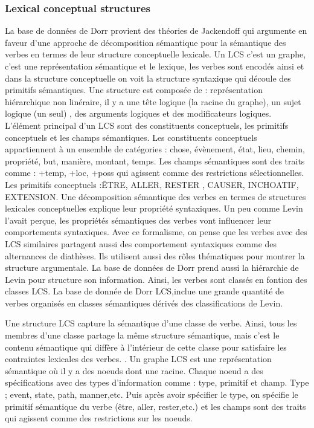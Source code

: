\subsubsection{Lexical conceptual structures}
La base de données de Dorr provient des théories de Jackendoff qui argumente en faveur d'une approche de décomposition sémantique pour la sémantique des verbes en termes de leur structure conceptuelle lexicale\citep{DorrUseLexicalSemantics1992}. Un LCS c'est un graphe, c'est une représentation sémantique et le lexique, les verbes sont encodés ainsi et dans la structure conceptuelle on voit la structure syntaxique qui découle des primitifs sémantiques. Une structure est composée de : représentation hiérarchique non linéraire, il y a une tête logique (la racine du graphe), un sujet logique (un seul) , des arguments logiques et des modificateurs logiques. L'élément principal d'un LCS sont des constituents conceptuels, les primitifs conceptuels et les champs sémantiques. Les constituents conceptuels appartiennent à un ensemble de catégories : chose, évènement, état, lieu, chemin, propriété, but, manière, montant, temps. Les champs sémantiques sont des traits comme : +temp, +loc, +poss qui agissent comme des restrictions sélectionnelles. Les primitifs conceptuels :ÊTRE, ALLER, RESTER , CAUSER, INCHOATIF, EXTENSION. Une décomposition sémantique des verbes en termes de structures lexicales conceptuelles explique leur propriété syntaxiques. Un peu comme Levin l'avait perçue, les propriétés sémantiques des verbes vont influencer leur comportements syntaxiques. Avec ce formalisme, on pense que les verbes avec des LCS similaires partagent aussi des comportement syntaxiques comme des alternances de diathèses. Ils utilisent aussi des rôles thématiques pour montrer la structure argumentale. La base de données de Dorr prend aussi la hiérarchie de Levin pour structure son information. Ainsi, les verbes sont classés en fontion des classes LCS. La base de donnée de Dorr LCS,inclue une grande quantité de verbes organisés en classes sémantiques dérivés des classifications de Levin.

Une structure LCS capture la sémantique d'une classe de verbe. Ainsi, tous les membres d'une classe partage la même structure sémantique, mais c'est le contenu sémantique qui diffère à l'intérieur de cette classe pour satisfaire les contraintes lexicales des verbes. \citep{TraumGenerationLexicalConceptual2000}. Un graphe LCS est une représentation sémantique où il y a des noeuds dont une racine. Chaque noeud a des spécifications avec des types d'information comme : type, primitif et champ. Type ; event, state, path, manner,etc. Puis après avoir spécifier le type, on spécifie le primitif sémantique du verbe (être, aller, rester,etc.)  et les champs sont des traits qui agissent comme des restrictions sur les noeuds.

